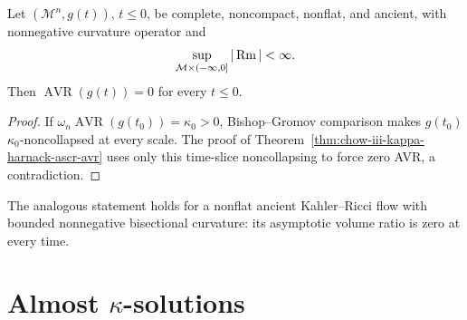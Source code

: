 \begin{corollary}[Any ancient solution with bounded $\Rm\ge0$ must have AVR $=0$]
\label{cor:chow-iii-ancient-bounded-nonnegative-avr-zero}


Let $(\mathcal M^n,g(t))$, $t\le0$, be complete, noncompact, nonflat, and
ancient, with nonnegative curvature operator and
\[
 \sup_{\mathcal M\times(-\infty,0]}|\operatorname{Rm}|<\infty.
\]
Then $\operatorname{AVR}(g(t))=0$ for every $t\le0$.
\end{corollary}
\begin{proof}
\sketch If $\omega_n\operatorname{AVR}(g(t_0))=\kappa_0>0$, Bishop--Gromov
comparison makes $g(t_0)$ $\kappa_0$-noncollapsed at every scale.  The proof
of Theorem~\ref{thm:chow-iii-kappa-harnack-ascr-avr} uses only this
time-slice noncollapsing to force zero AVR, a contradiction.
\end{proof}

\begin{remark}
\label{rem:chow-iii-kahler-ancient-avr-zero}

The analogous statement holds for a nonflat ancient Kahler--Ricci flow with
bounded nonnegative bisectional curvature: its asymptotic volume ratio is
zero at every time.
\end{remark}

\section{\texorpdfstring{Almost $\kappa$-solutions}{Almost Kappa-solutions}}

